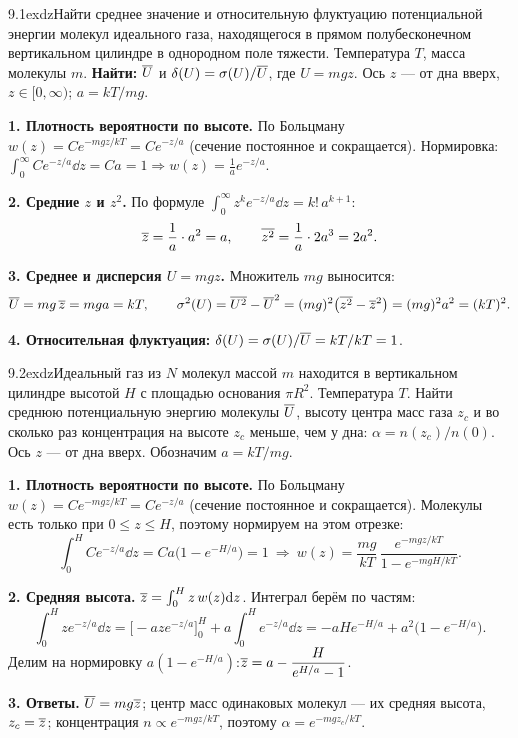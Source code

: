 \begin{problem}{9.1}{exdz}{Найти среднее значение и относительную флуктуацию потенциальной энергии молекул идеального газа,
находящегося в прямом полубесконечном вертикальном цилиндре в однородном поле тяжести. Температура $T$, масса молекулы $m$.}
\textbf{Найти:} $\overline{U}$ и $\delta(U)=\sigma(U)/\overline{U}$, где $U=mgz$. Ось $z$ — от дна вверх, $z\in[0,\infty)$; $a=kT/mg$.

\textbf{1. Плотность вероятности по высоте.} По Больцману $w(z)=Ce^{-mgz/kT}=Ce^{-z/a}$ (сечение постоянное и сокращается).
Нормировка: $\int_0^\infty Ce^{-z/a}\dd z=Ca=1\Rightarrow w(z)=\frac1ae^{-z/a}$.

\textbf{2. Средние $z$ и $z^2$.} По формуле $\int_0^\infty z^ke^{-z/a}\dd z=k!\,a^{k+1}$:
\[\overline{z}=\frac1a\cdot a^2=a,\qquad \overline{z^2}=\frac1a\cdot2a^3=2a^2.\]

\textbf{3. Среднее и дисперсия $U=mgz$.} Множитель $mg$ выносится:
\[\overline{U}=mg\,\overline{z}=mga=kT,\qquad
\sigma^2(U)=\overline{U^2}-\overline{U}^2=(mg)^2\big(\overline{z^2}-\overline{z}^2\big)=(mg)^2a^2=(kT)^2.\]

\textbf{4. Относительная флуктуация:} $\delta(U)=\sigma(U)/\overline{U}=kT/kT=1$.
\end{problem}

\begin{problem}{9.2}{exdz}{Идеальный газ из $N$ молекул массой $m$ находится в вертикальном цилиндре высотой $H$ с площадью основания $\pi R^2$.
Температура $T$. Найти среднюю потенциальную энергию молекулы $\overline{U}$, высоту центра масс газа $z_c$ и во сколько раз
концентрация на высоте $z_c$ меньше, чем у дна: $\alpha=n(z_c)/n(0)$.}
Ось $z$ — от дна вверх. Обозначим $a=kT/mg$.

\textbf{1. Плотность вероятности по высоте.} По Больцману $w(z)=Ce^{-mgz/kT}=Ce^{-z/a}$ (сечение постоянное и сокращается).
Молекулы есть только при $0\le z\le H$, поэтому нормируем на этом отрезке:
\[\int_0^HCe^{-z/a}\dd z=Ca\big(1-e^{-H/a}\big)=1\ \Rightarrow\
w(z)=\frac{mg}{kT}\,\frac{e^{-mgz/kT}}{1-e^{-mgH/kT}}.\]

\textbf{2. Средняя высота.} $\overline{z}=\int_0^Hz\,w(z)\mathrm{d} z$. Интеграл берём по частям:
\[\int_0^Hze^{-z/a}\dd z=\Big[-aze^{-z/a}\Big]_0^H+a\int_0^He^{-z/a}\dd z=-aHe^{-H/a}+a^2\big(1-e^{-H/a}\big).\]
Делим на нормировку $a(1-e^{-H/a})$:\quad $\overline{z}=a-\dfrac{H}{e^{H/a}-1}$.

\textbf{3. Ответы.} $\overline{U}=mg\overline{z}$; центр масс одинаковых молекул — их средняя высота, $z_c=\overline{z}$;
концентрация $n\propto e^{-mgz/kT}$, поэтому $\alpha=e^{-mgz_c/kT}$.
\note{при $H\to\infty$ получается 9.1: $\avg U=kT$, $z_c=kT/mg$.}
\end{problem}

